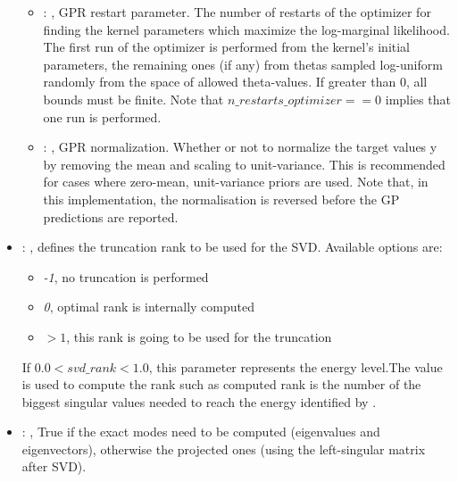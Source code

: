 \begin{itemize}
\begin{itemize}
        \item {}: , 
          GPR restart parameter. The number of restarts of the optimizer for finding the
          kernel parameters which maximize the log-marginal likelihood. The first run of the
          optimizer                                                  is performed from the kernel’s
          initial parameters, the remaining ones (if any) from thetas
          sampled log-uniform randomly from the space of allowed theta-values. If greater than 0,
          all bounds must be finite. Note that $n\_restarts\_optimizer == 0$ implies that one run is
          performed.

        \item {}: , 
          GPR normalization. Whether or not to normalize the target values y by removing the mean
          and scaling                                                  to unit-variance. This is
          recommended for cases where zero-mean, unit-variance priors are used.
          Note that, in this implementation, the normalisation is reversed before the GP predictions
          are reported.
      \end{itemize}

    \item {}: , 
      defines the truncation rank to be used for the SVD.
      Available options are:                                                  \begin{itemize}
      \item \textit{-1}, no truncation is performed
      \item \textit{0}, optimal rank is internally computed
      \item \textit{$>1$}, this rank is going to be used for the truncation
      \end{itemize}                                                  If $0.0 < svd\_rank < 1.0$, this
      parameter represents the energy level.The value is used to compute the rank such
      as computed rank is the number of the biggest singular values needed to reach the energy
      identified by                                                    .

    \item {}: , 
      True if the exact modes need to be computed (eigenvalues and
      eigenvectors),   otherwise the projected ones (using the left-singular matrix after SVD).


\end{itemize}
